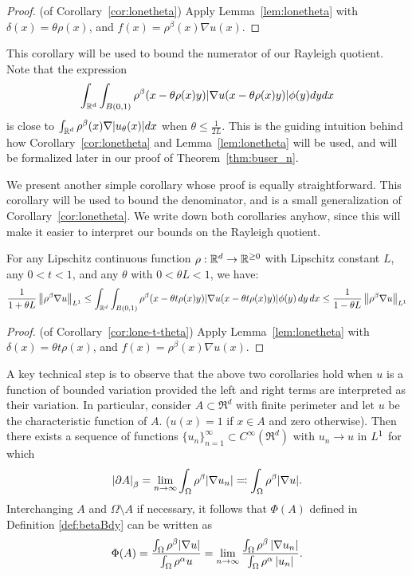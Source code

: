 \begin{proof} (of Corollary~\ref{cor:lonetheta}) Apply
  Lemma~\ref{lem:lonetheta} with $\delta(x) = \theta \rho(x)$, and
  $f(x) = \rho^\beta(x) \nabla u(x)$.
\end{proof}

This corollary will be used to bound the numerator of our
Rayleigh quotient.
Note that the expression
\[ \int_{\mathbb{R}^d} \int_{B(0,1)} \rho^\beta ( x - \theta \rho(x) y)
|\nabla u(x-\theta \rho(x)y)| \phi(y) dy dx
\]
is close to $\int_{\mathbb{R}^d} \rho^\beta(x) \nabla |u_\theta(x)| dx$ when
$\theta \leq \frac{1}{2L}$. This is the guiding intuition behind how
Corollary~\ref{cor:lonetheta} and Lemma~\ref{lem:lonetheta} will be
used, and will be formalized later in our proof of
Theorem~\ref{thm:buser_n}.

We present another simple corollary whose proof is equally
straightforward. This corollary will be used to bound the denominator,
and is a small generalization of Corollary~\ref{cor:lonetheta}. We
write down both corollaries anyhow, since this will make it easier to
interpret our bounds on the Rayleigh quotient.

\begin{corollary}\label{cor:lone-t-theta}
For any Lipschitz continuous function $\rho: \mathbb{R}^d \rightarrow \mathbb{R}^{\geq 0}$
with Lipschitz constant $L$, any $0 < t < 1$, and any $\theta$ with $0 < \theta L < 1$, we have:
$$
\frac{1}{1+\theta L} \left\lVert \rho^\beta \nabla u \right\rVert_{L^1}
\leq \int_{\mathbb{R}^d} \int_{B(0,1)} \rho^\beta ( x - \theta t \rho(x) y)
|\nabla u(x-\theta t \rho(x)y)| \phi(y)\,dy\,dx
\leq \frac{1}{1-\theta L} \left\lVert  \rho^\beta \nabla u \right\rVert_{L^1}
$$
\end{corollary}

\begin{proof} (of Corollary~\ref{cor:lone-t-theta})
    Apply Lemma~\ref{lem:lonetheta} with
    $\delta(x) = \theta t \rho(x)$, and $f(x) = \rho^\beta(x) \nabla u(x)$.
\end{proof}

A key technical step is to observe that the above two corollaries hold
when $u$ is a function of bounded variation provided the left and right
terms are interpreted as their variation. In particular, consider $A
\subset \Re^d$ with finite perimeter and let $u$ be the
characteristic function of $A$. ($u(x) = 1$ if $x \in A$ and zero
otherwise). Then there exists a sequence of functions
$\{u_n\}_{n=1}^\infty \subset C^\infty(\Re^d)$ with $u_n \rightarrow
u$ in ${L^1}$ for which \cite{EvansMeasure15}
\begin{equation} \label{eqn:Aapprox}
\left| \partial A \right|_\beta
= \lim_{n \rightarrow \infty} \int_\Omega  \rho^\beta|\nabla u_n|
\eqqcolon  \int_\Omega  \rho^\beta|\nabla u|.
\end{equation}
Interchanging $A$ and $\Omega \setminus A$ if necessary, it follows that
$\Phi(A)$ defined in Definition \ref{def:betaBdy} can be written as
$$
\Phi(A) 
= \frac{\int_\Omega \rho^\beta |\nabla u|}{\int_\Omega \rho^\alpha u}
= \lim_{n\to\infty}\frac{\int_\Omega \rho^\beta\left| \nabla u_n \right|}{\int_\Omega\rho^\alpha \left| u_n \right|}.
$$